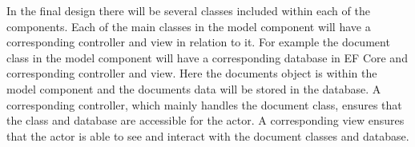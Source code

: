 In the final design there will be several classes included within each of the components.
Each of the main classes in the model component will have a corresponding controller and view in relation to it.
For example the document class in the model component will have a corresponding database in EF Core and corresponding controller and view.
Here the documents object is within the model component and the documents data will be stored in the database.
A corresponding controller, which mainly handles the document class, ensures that the class and database are accessible for the actor.
A corresponding view ensures that the actor is able to see and interact with the document classes and database.
